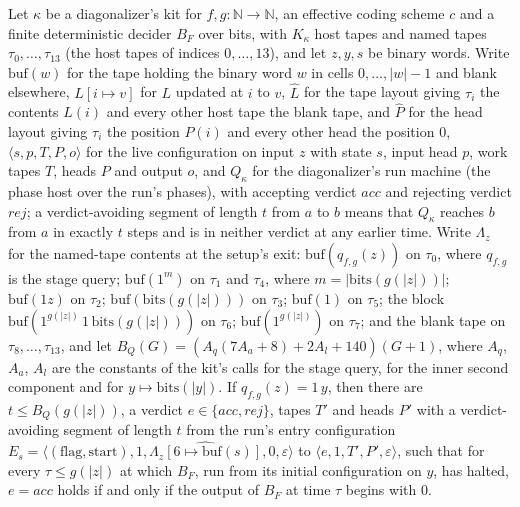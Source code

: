 \begin{theorem}
Let $\kappa$ be a diagonalizer's kit for $f, g : \mathbb{N} \to \mathbb{N}$, an effective coding scheme $c$ and a finite deterministic decider $B_F$ over bits, with $K_\kappa$ host tapes and named tapes $\tau_0, \dots, \tau_{13}$ (the host tapes of indices $0, \dots, 13$), and let $z, y, s$ be binary words. Write $\mathrm{buf}(w)$ for the tape holding the binary word $w$ in cells $0, \dots, |w| - 1$ and blank elsewhere, $L[i \mapsto v]$ for $L$ updated at $i$ to $v$, $\hat L$ for the tape layout giving $\tau_i$ the contents $L(i)$ and every other host tape the blank tape, and $\hat P$ for the head layout giving $\tau_i$ the position $P(i)$ and every other head the position $0$, $\langle s, p, T, P, o\rangle$ for the live configuration on input $z$ with state $s$, input head $p$, work tapes $T$, heads $P$ and output $o$, and $Q_\kappa$ for the diagonalizer's run machine (the phase host over the run's phases), with accepting verdict $\mathit{acc}$ and rejecting verdict $\mathit{rej}$; a verdict-avoiding segment of length $t$ from $a$ to $b$ means that $Q_\kappa$ reaches $b$ from $a$ in exactly $t$ steps and is in neither verdict at any earlier time. Write $\Lambda_z$ for the named-tape contents at the setup's exit: $\mathrm{buf}(q_{f,g}(z))$ on $\tau_0$, where $q_{f,g}$ is the stage query; $\mathrm{buf}(1^m)$ on $\tau_1$ and $\tau_4$, where $m = |\mathrm{bits}(g(|z|))|$; $\mathrm{buf}(1z)$ on $\tau_2$; $\mathrm{buf}(\mathrm{bits}(g(|z|)))$ on $\tau_3$; $\mathrm{buf}(1)$ on $\tau_5$; the block $\mathrm{buf}(1^{g(|z|)}\,1\,\mathrm{bits}(g(|z|)))$ on $\tau_6$; $\mathrm{buf}(1^{g(|z|)})$ on $\tau_7$; and the blank tape on $\tau_8, \dots, \tau_{13}$, and let $B_Q(G) = (A_q(7A_a + 8) + 2A_l + 140)(G + 1)$, where $A_q$, $A_a$, $A_l$ are the constants of the kit's calls for the stage query, for the inner second component and for $y \mapsto \mathrm{bits}(|y|)$. If $q_{f,g}(z) = 1\,y$, then there are $t \le B_Q(g(|z|))$, a verdict $e \in \{\mathit{acc}, \mathit{rej}\}$, tapes $T'$ and heads $P'$ with a verdict-avoiding segment of length $t$ from the run's entry configuration $E_s = \langle (\text{flag}, \text{start}), 1, \widehat{\Lambda_z[6 \mapsto \mathrm{buf}(s)]}, 0, \varepsilon\rangle$ to $\langle e, 1, T', P', \varepsilon\rangle$, such that for every $\tau \le g(|z|)$ at which $B_F$, run from its initial configuration on $y$, has halted, $e = \mathit{acc}$ holds if and only if the output of $B_F$ at time $\tau$ begins with $0$.
\end{theorem}

